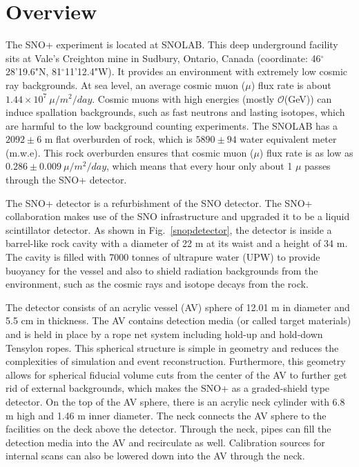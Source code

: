 
\section{Overview}\label{sect:overview}
The SNO+ experiment is located at SNOLAB. This deep underground facility sits at Vale's Creighton mine in Sudbury, Ontario, Canada (coordinate: 46$^\circ$28'19.6"N, 81$^\circ$11'12.4"W). It provides an environment with extremely low cosmic ray backgrounds. At sea level, an average cosmic muon ($\mu$) flux rate is about $1.44\times 10^7~\mu/m^2/day$\cite{muonflux}. Cosmic muons with high energies (mostly $\mathcal{O}$(GeV)) can induce spallation backgrounds, such as fast neutrons and lasting isotopes, which are harmful to the low background counting experiments\cite{beacom2017physics}. The SNOLAB has a $2092\pm6$ m flat overburden of rock, which is $5890\pm94$ water equivalent meter (m.w.e). This rock overburden ensures that cosmic muon ($\mu$) flux rate is as low as $0.286\pm0.009~\mu/m^2/day$\cite{snop_jinst}, which means that every hour only about 1 $\mu$ passes through the SNO+ detector. 

The SNO+ detector is a refurbishment of the SNO detector. The SNO+ collaboration makes use of the SNO infrastructure and upgraded it to be a liquid scintillator detector. As shown in Fig.~\ref{snopdetector}, the detector is inside a barrel-like rock cavity with a diameter of 22 m at its waist and a height of 34 m. The cavity is filled with 7000 tonnes of ultrapure water (UPW) to provide buoyancy for the vessel and also to shield radiation backgrounds from the environment, such as the cosmic rays and isotope decays from the rock. 

The detector consists of an acrylic vessel (AV) sphere of 12.01 m in diameter and 5.5 cm in thickness. The AV contains detection media (or called target materials) and is held in place by a rope net system including hold-up and hold-down Tensylon ropes. This spherical structure is simple in geometry and reduces the complexities of simulation and event reconstruction. Furthermore, this geometry allows for spherical fiducial volume cuts from the center of the AV to further get rid of external backgrounds, which makes the SNO+ as a graded-shield type detector\cite{waterfield2017optical}.
On the top of the AV sphere, there is an acrylic neck cylinder with 6.8 m high and 1.46 m inner diameter. The neck connects the AV sphere to the facilities on the deck above the detector. Through the neck, pipes can fill the detection media into the AV and recirculate as well. Calibration sources for internal scans can also be lowered down into the AV through the neck.

